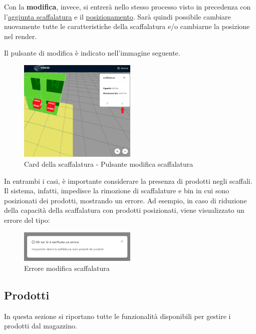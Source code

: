             \bigskip
            \noindent Con la \textbf{modifica}, invece, si entrerà nello stesso processo visto in precedenza con l'\hyperref[sec:scaffalature:aggiunta]{aggiunta scaffalatura} 
            e il \hyperref[sec:scaffalature:posizionamento]{posizionamento}. 
            Sarà quindi possibile cambiare nuovamente tutte le caratteristiche della scaffalatura e/o cambiarne la posizione nel render. 
            
            \noindent Il pulsante di modifica è indicato nell'immagine seguente.
            \begin{figure}[H]
                \centering
                \includegraphics[width=0.5\textwidth]{images/pulsante_modifica_scaff.png}
                \caption{Card della scaffalatura - Pulsante modifica scaffalatura}
            \end{figure}

            \bigskip
            In entrambi i casi, è importante considerare la presenza di prodotti negli scaffali. Il sistema, infatti, impedisce la rimozione di scaffalature e bin in cui sono posizionati dei prodotti, mostrando un errore. Ad esempio, in caso di riduzione della capacità della scaffalatura con prodotti posizionati, viene visualizzato un errore del tipo:\\
            \begin{figure}[h!]
                \centering
                \includegraphics[width=0.5\textwidth]{images/errore_modifica.png}
                \caption{Errore modifica scaffalatura}
            \end{figure}

    \newpage            
    \subsection{Prodotti}\label{sec:prodotti}
    In questa sezione si riportano tutte le funzionalità disponibili per gestire i prodotti dal magazzino.
